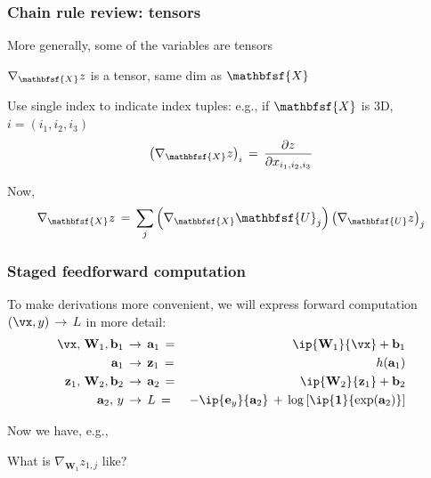 \documentclass[xcolor=dvipsnames]{beamer}
\begin{document}
\begin{frame}
  \frametitle{Chain rule review: tensors}
  \bi
\item More generally, some of the variables are tensors
\item $\nabla_{\mathbfsf{X}}z$ is a tensor, same dim as
  $\mathbfsf{X}$
\item Use single index to indicate index tuples: e.g., if
  $\mathbfsf{X}$ is 3D, $i=(i_1,i_2,i_3)$
\[\left(\nabla_{\mathbfsf{X}}z\right)_i\,=\,
\frac{\partial z}{\partial x_{i_1,i_2,i_3}}
\]
\item Now,
\[\nabla_{\mathbfsf{X}}z\,=\,\sum_j
\left(\nabla_{\mathbfsf{X}}\mathbfsf{U}_j\right)
\left(\nabla_{\mathbfsf{U}}z\right)_j
\]
\ei
\end{frame}

\begin{frame}
  \frametitle{Staged feedforward computation}
\bi
\item To make derivations more convenient, we will express forward
  computation $(\vx,y)\,\to\,L$ in more detail:
\begin{align*}
\vx,\,\mathbf{W}_1,\mathbf{b}_1\,&\to\,\mathbf{a}_1\,=&\,\ip{\mathbf{W}_1}{\vx}+\mathbf{b}_1\\
\mathbf{a}_1\,&\to\,\mathbf{z}_1\,=&\,h(\mathbf{a}_1)\\
\mathbf{z}_1,\,\mathbf{W}_2,\mathbf{b}_2\,&\to\,\mathbf{a}_2\,=&\ip{\mathbf{W}_2}{\mathbf{z}_1}+\mathbf{b}_2\\
\mathbf{a}_2,\,y\,&\to\,L\,=&\,-\ip{\mathbf{e}_y}{\mathbf{a}_2}\,+\,
       \log \left[\ip{\mathbf{1}}{\exp(\mathbf{a}_2)}\right]\\
\end{align*}
\vspace{-2em}
\item Now we have, e.g.,
\item What is $\nabla_{\mathbf{W}_1}z_{1,j}$ like?
\ei
\end{frame}
\end{document}
